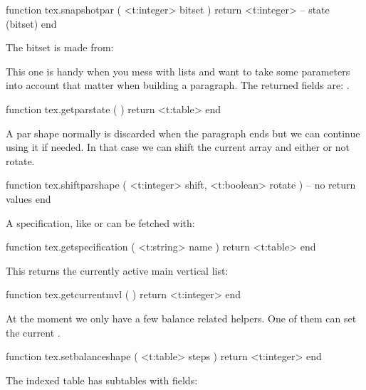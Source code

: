 \starttyping[option=LUA]
function tex.snapshotpar ( <t:integer> bitset )
    return <t:integer> -- state (bitset)
end
\stoptyping

The bitset is made from:

\startthreerows
{}
\stopthreerows

This one is handy when you mess with lists and want to take some parameters
into account that matter when building a paragraph. The returned fields are:
.

\starttyping[option=LUA]
function tex.getparstate ( )
    return <t:table>
end
\stoptyping

A par shape normally is discarded when the paragraph ends but we can continue
using it if needed. In that case we can shift the current array and either
or not rotate.

\starttyping[option=LUA]
function tex.shiftparshape (
    <t:integer> shift,
    <t:boolean> rotate
)
    -- no return values
end
\stoptyping

A specification, like \type {\parshape} or \type {\widowpenalties} can be fetched
with:

\starttyping[option=LUA]
function tex.getspecification ( <t:string> name )
    return <t:table>
end
\stoptyping

\stopsubsection

\startsubsection[title=MVL]

This returns the currently active main vertical list:

\starttyping[option=LUA]
function tex.getcurrentmvl ( )
    return <t:integer>
end
\stoptyping

\stopsubsection

\startsubsection[title=Balancing]

At the moment we only have a few balance related helpers. One of them can set
the current .

\starttyping[option=LUA]
function tex.setbalanceshape (
    <t:table> steps
)
    return <t:integer>
end
\stoptyping

The indexed table has subtables with fields:

\starttabulate[|l|l|]
\NC {}      \NC {}         \NC \NR
\NC {}    \NC {}         \NC \NR
\NC {}      \NC {}          \NC \NR
\NC {}    \NC {} \NC \NR
\NC {} \NC {} \NC \NR
\NC {}      \NC {}          \NC \NR
\stoptabulate


